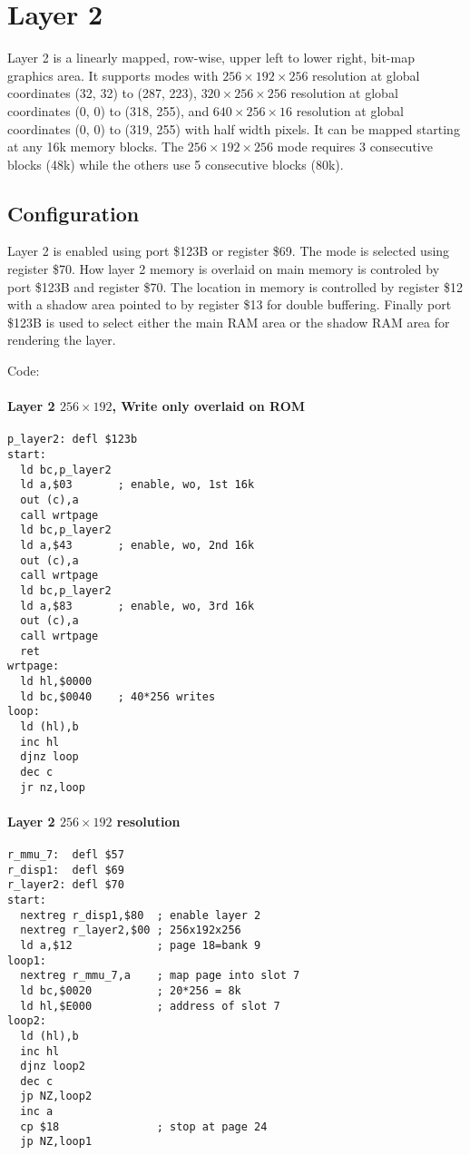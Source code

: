 \section{Layer 2}
Layer 2 is a linearly mapped, row-wise, upper left to lower right,
bit-map graphics area.  It supports modes with $256\times192\times256$
resolution at global coordinates (32, 32) to (287, 223),
$320\times256\times256$ resolution at global coordinates (0, 0) to
(318, 255), and $640\times256\times16$ resolution at global
coordinates (0, 0) to (319, 255) with half width pixels. It can be
mapped starting at any 16k memory blocks. The $256\times192\times256$
mode requires 3 consecutive blocks (48k) while the others use 5
consecutive blocks (80k).

\subsection{Configuration}
Layer 2 is enabled using port \$123B or register \$69. The mode is
selected using register \$70. How layer 2 memory is overlaid on main
memory is controled by port \$123B and register \$70. The location in
memory is controlled by register \$12 with a shadow area pointed to by
register \$13 for double buffering. Finally port \$123B is used to
select either the main RAM area or the shadow RAM area for rendering
the layer.






\sinset
Code:
\paragraph{Layer 2 $256\times192$, Write only overlaid on ROM}
\begin{verbatim}
p_layer2: defl $123b
start:
  ld bc,p_layer2
  ld a,$03       ; enable, wo, 1st 16k
  out (c),a
  call wrtpage
  ld bc,p_layer2
  ld a,$43       ; enable, wo, 2nd 16k
  out (c),a
  call wrtpage
  ld bc,p_layer2
  ld a,$83       ; enable, wo, 3rd 16k
  out (c),a
  call wrtpage
  ret
wrtpage:  
  ld hl,$0000
  ld bc,$0040    ; 40*256 writes
loop:
  ld (hl),b
  inc hl
  djnz loop
  dec c
  jr nz,loop
\end{verbatim}
\paragraph{Layer 2 $256\times192$ resolution}
\begin{verbatim}
r_mmu_7:  defl $57
r_disp1:  defl $69
r_layer2: defl $70
start:
  nextreg r_disp1,$80  ; enable layer 2
  nextreg r_layer2,$00 ; 256x192x256
  ld a,$12             ; page 18=bank 9
loop1:
  nextreg r_mmu_7,a    ; map page into slot 7
  ld bc,$0020          ; 20*256 = 8k
  ld hl,$E000          ; address of slot 7
loop2:
  ld (hl),b
  inc hl
  djnz loop2
  dec c
  jp NZ,loop2
  inc a
  cp $18               ; stop at page 24
  jp NZ,loop1
\end{verbatim}

